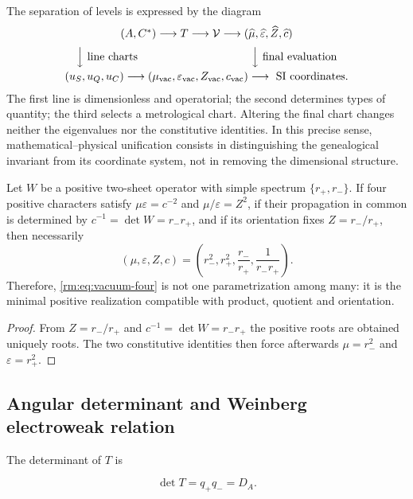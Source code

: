 The separation of levels is expressed by the diagram
\[
\begin{array}{c}
(A,C^*)\longrightarrow T\longrightarrow\mathcal V
\longrightarrow
(\widehat\mu,\widehat\varepsilon,\widehat Z,\widehat c)
\\[2mm]
\Big\downarrow\text{ line charts}\hspace{36mm}
\Big\downarrow\text{ final evaluation}
\\[2mm]
(u_S,u_Q,u_C)\longrightarrow
(\mu_{\rm vac},\varepsilon_{\rm vac},Z_{\rm vac},c_{\rm vac})
\longrightarrow\text{ SI coordinates}.
\end{array}
\]
The first line is dimensionless and operatorial; the second determines types of
quantity; the third selects a metrological chart. Altering the final chart
changes neither the eigenvalues nor the constitutive identities. In this
precise sense, mathematical--physical unification consists in distinguishing
the genealogical invariant from its coordinate system, not in removing the
dimensional structure.

\begin{proposition}
Let \(W\) be a positive two-sheet operator with simple spectrum
\(\{r_+,r_-\}\). If four positive characters satisfy
\(\mu\varepsilon=c^{-2}\) and \(\mu/\varepsilon=Z^2\), if their propagation in common is determined by \(c^{-1}=\det W=r_-r_+\), and if its orientation
fixes \(Z=r_-/r_+\), then necessarily
\[
(\mu,\varepsilon,Z,c)
=\left(r_-^2,r_+^2,\frac{r_-}{r_+},\frac1{r_-r_+}\right).
\]
Therefore, \cref{rm:eq:vacuum-four} is not one parametrization among many:
it is the minimal positive realization compatible with product, quotient and
orientation.
\end{proposition}

\begin{proof}
From \(Z=r_-/r_+\) and \(c^{-1}=\det W=r_-r_+\) the positive roots are obtained uniquely
roots. The two constitutive identities then force afterwards
\(\mu=r_-^2\) and \(\varepsilon=r_+^2\).
\end{proof}

\subsection{Angular determinant and Weinberg electroweak relation}

The determinant of \(T\) is

\begin{equation}
\det T=q_+q_-=D_A.
\label{rm:eq:detT}
\end{equation}

